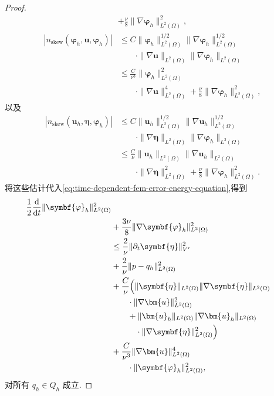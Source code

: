 \begin{theorem}
\begin{proof}
\begin{equation}
\begin{aligned}
        +\frac{\nu}{8}\|\nabla\symbf{\varphi}_h\|_{L^2(\Omega)}^2,
\end{aligned}
\end{equation}
\begin{equation}\label{eq:time-dependent-fem-error-nonlinear-phi}
\begin{aligned}
  |n_{\mathrm{skew}}(\symbf{\varphi}_h,\bm{u},\symbf{\varphi}_h)|
  &\le C\|\symbf{\varphi}_h\|_{L^2(\Omega)}^{1/2}
       \|\nabla\symbf{\varphi}_h\|_{L^2(\Omega)}^{1/2}\\
  &\qquad\cdot\|\nabla\bm{u}\|_{L^2(\Omega)}
       \|\nabla\symbf{\varphi}_h\|_{L^2(\Omega)}\\
  &\le \frac{C}{\nu^3}\|\symbf{\varphi}_h\|_{L^2(\Omega)}^2\\
  &\qquad\cdot\|\nabla\bm{u}\|_{L^2(\Omega)}^4
        +\frac{\nu}{8}\|\nabla\symbf{\varphi}_h\|_{L^2(\Omega)}^2,
\end{aligned}
\end{equation}
以及
\begin{equation}\label{eq:time-dependent-fem-error-nonlinear-projection}
\begin{aligned}
  |n_{\mathrm{skew}}(\bm{u}_h,\symbf{\eta},\symbf{\varphi}_h)|
  &\le C\|\bm{u}_h\|_{L^2(\Omega)}^{1/2}
       \|\nabla\bm{u}_h\|_{L^2(\Omega)}^{1/2}\\
  &\qquad\cdot\|\nabla\symbf{\eta}\|_{L^2(\Omega)}
       \|\nabla\symbf{\varphi}_h\|_{L^2(\Omega)}\\
  &\le \frac{C}{\nu}\|\bm{u}_h\|_{L^2(\Omega)}
       \|\nabla\bm{u}_h\|_{L^2(\Omega)}\\
  &\qquad\cdot\|\nabla\symbf{\eta}\|_{L^2(\Omega)}^2
        +\frac{\nu}{8}\|\nabla\symbf{\varphi}_h\|_{L^2(\Omega)}^2.
\end{aligned}
\end{equation}
将这些估计代入\cref{eq:time-dependent-fem-error-energy-equation},得到
\[
\begin{aligned}
  \frac{1}{2}\frac{\mathrm{d}}{\mathrm{d}t}
      \|\symbf{\varphi}_h\|_{L^2(\Omega)}^2\\
  &+\frac{3\nu}{8}\|\nabla\symbf{\varphi}_h\|_{L^2(\Omega)}^2\\
  &\le\frac{2}{\nu}\|\partial_t\symbf{\eta}\|_{V'}^2\\
      &+\frac{2}{\nu}\|p-q_h\|_{L^2(\Omega)}^2\\
    &+\frac{C}{\nu}\Bigl(
      \|\symbf{\eta}\|_{L^2(\Omega)}
      \|\nabla\symbf{\eta}\|_{L^2(\Omega)}\\
    &\qquad\cdot\|\nabla\bm{u}\|_{L^2(\Omega)}^2\\
    &\qquad+
      \|\bm{u}_h\|_{L^2(\Omega)}
      \|\nabla\bm{u}_h\|_{L^2(\Omega)}\\
    &\qquad\quad\cdot\|\nabla\symbf{\eta}\|_{L^2(\Omega)}^2
      \Bigr)\\
    &+\frac{C}{\nu^3}\|\nabla\bm{u}\|_{L^2(\Omega)}^4\\
    &\qquad\cdot\|\symbf{\varphi}_h\|_{L^2(\Omega)}^2,
\end{aligned}
\]
对所有 $q_h\in Q_h$ 成立.


\end{proof}
\end{theorem}
